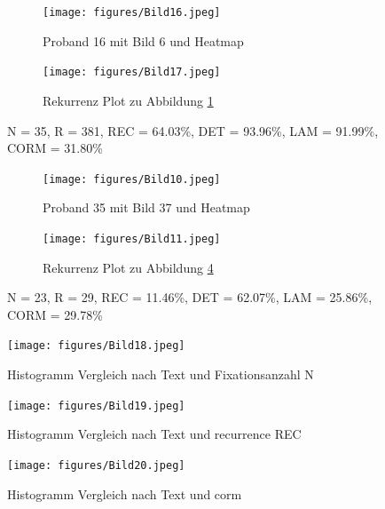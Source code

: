 \documentclass[
    language=german, %
    thesis=seminar, %
    supervisor=postdoc, %
    multiauthor=true, %
    ]{settings/csssa-thesis}
\begin{document}
\begin{figure}[ht]
    \centering
    \begin{subfigure}{0.49\textwidth}
        \centering
        \texttt{[image: figures/Bild16.jpeg]}
        \caption{Proband 16 mit Bild 6 und Heatmap}\label{fig:Bild14a}
    \end{subfigure}
    \begin{subfigure}{0.49\textwidth}
        \centering
        \texttt{[image: figures/Bild17.jpeg]}
        \caption{Rekurrenz Plot zu Abbildung \ref{fig:Bild14a}}\label{fig:Bild14b}
    \end{subfigure}\label{fig:Bild14}
    \caption{N = 35, R = 381, REC = 64.03\%, DET = 93.96\%, LAM = 91.99\%, CORM = 31.80\%}
\end{figure}
\begin{figure}[ht]
    \centering
    \begin{subfigure}{0.49\textwidth}
        \centering
        \texttt{[image: figures/Bild10.jpeg]}
        \caption{Proband 35 mit Bild 37 und Heatmap}\label{fig:Bild10a}
    \end{subfigure}
    \begin{subfigure}{0.49\textwidth}
        \centering
        \texttt{[image: figures/Bild11.jpeg]}
        \caption{Rekurrenz Plot zu Abbildung \ref{fig:Bild10a}}\label{fig:Bild10b}
    \end{subfigure}\label{fig:Bild10}
    \caption{N = 23, R = 29, REC = 11.46\%, DET = 62.07\%, LAM = 25.86\%, CORM = 29.78\%}
\end{figure}
\begin{figure}[h]
    \centering
    \texttt{[image: figures/Bild18.jpeg]}
    \caption{Histogramm Vergleich nach Text und Fixationsanzahl N}\label{fig:bild15}
\end{figure}
\begin{figure}[h]
    \centering
    \texttt{[image: figures/Bild19.jpeg]}
    \caption{Histogramm Vergleich nach Text und recurrence REC}\label{fig:bild16}
\end{figure}
\begin{figure}[h]
    \centering
    \texttt{[image: figures/Bild20.jpeg]}
    \caption{Histogramm Vergleich nach Text und corm}\label{fig:bild17}
\end{figure}
\end{document}
